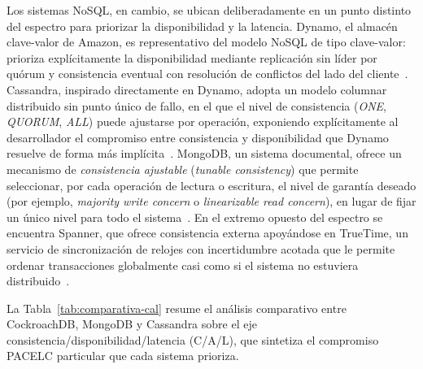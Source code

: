 \documentclass[11pt,a4paper]{article}
\begin{document}
Los sistemas NoSQL, en cambio, se ubican deliberadamente en un punto distinto
del espectro para priorizar la disponibilidad y la latencia. Dynamo, el
almac\'en clave-valor de Amazon, es representativo del modelo NoSQL de tipo
clave-valor: prioriza expl\'icitamente la disponibilidad mediante
replicaci\'on sin l\'ider por qu\'orum y consistencia eventual con resoluci\'on
de conflictos del lado del cliente~\cite{decandia2007,kleppmann2017}. Cassandra, inspirado
directamente en Dynamo, adopta un modelo columnar distribuido sin punto
\'unico de fallo, en el que el nivel de consistencia (\emph{ONE}, \emph{QUORUM},
\emph{ALL}) puede ajustarse por operaci\'on, exponiendo expl\'icitamente al
desarrollador el compromiso entre consistencia y disponibilidad que Dynamo
resuelve de forma m\'as impl\'icita~\cite{lakshman2010,kleppmann2017}. MongoDB, un sistema
documental, ofrece un mecanismo de \emph{consistencia ajustable} (\emph{tunable
consistency}) que permite seleccionar, por cada operaci\'on de lectura o
escritura, el nivel de garant\'ia deseado (por ejemplo, \emph{majority write
concern} o \emph{linearizable read concern}), en lugar de fijar un \'unico
nivel para todo el sistema~\cite{schultz2019,kleppmann2017}. En el extremo opuesto del
espectro se encuentra Spanner, que ofrece consistencia externa
apoy\'andose en TrueTime, un servicio de sincronizaci\'on de relojes con
incertidumbre acotada que le permite ordenar transacciones globalmente casi
como si el sistema no estuviera distribuido~\cite{corbett2013,kleppmann2017}.

La Tabla~\ref{tab:comparativa-cal} resume el an\'alisis comparativo entre
CockroachDB, MongoDB y Cassandra sobre el eje consistencia/disponibilidad/latencia
(C/A/L), que sintetiza el compromiso PACELC particular que cada sistema
prioriza.
\end{document}
